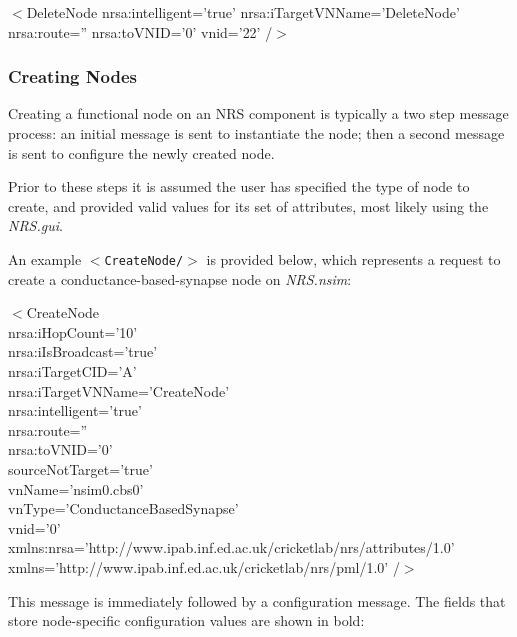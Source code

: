 \documentclass[pdftex,a4paper]{article}
\newcommand{\NRSgui}{{\it NRS.gui}}
\newcommand{\NRSnsim}{{\it NRS.nsim}}
\newcommand{\XML}[2][]{{\tt \small $<$#2#1/$>$}}
\newcommand{\XMLtext}[1]{
  \begin{tt}
    \begin{small}
      \begin{list}{}{
          \setlength{\topsep}{0pt}
          \setlength{\partopsep}{0pt}
          \setlength{\itemsep}{0pt}
          \setlength{\parsep}{0pt}
          \setlength{\leftmargin}{2em}
          \setlength{\rightmargin}{2em}
          \setlength{\labelsep}{0pt}
        }
      \item #1
      \end{list}
    \end{small}
  \end{tt}
}
\newcommand{\XMLsimple}[2][]{\XMLtext{$<$#2#1/$>$}}
\begin{document}
\XMLsimple[ nrsa:intelligent='true' nrsa:iTargetVNName='DeleteNode'
  nrsa:route='' nrsa:toVNID='0' vnid='22' %
  ]{DeleteNode}



\subsubsection{Creating Nodes}

Creating a functional node on an NRS component is typically a two step
message process: an initial message is sent to instantiate the node;
then a second message is sent to configure the newly created node.

Prior to these steps it is assumed the user has specified the type of
node to create, and provided valid values for its set of attributes,
most likely using the \NRSgui.

An example \XML{CreateNode} is provided below, which represents a
request to create a conductance-based-synapse node on \NRSnsim:

\XMLsimple[\\
nrsa:iHopCount='10'\\
nrsa:iIsBroadcast='true'\\
nrsa:iTargetCID='A'\\
nrsa:iTargetVNName='CreateNode'\\
nrsa:intelligent='true'\\
nrsa:route=''\\
nrsa:toVNID='0'\\
sourceNotTarget='true'\\
vnName='nsim0.cbs0'\\
vnType='ConductanceBasedSynapse'\\
vnid='0'\\
xmlns:nrsa='http://www.ipab.inf.ed.ac.uk/cricketlab/nrs/attributes/1.0'\\
xmlns='http://www.ipab.inf.ed.ac.uk/cricketlab/nrs/pml/1.0'
]{CreateNode}

This message is immediately followed by a configuration message. The
fields that store node-specific configuration values are shown in bold:
\end{document}
